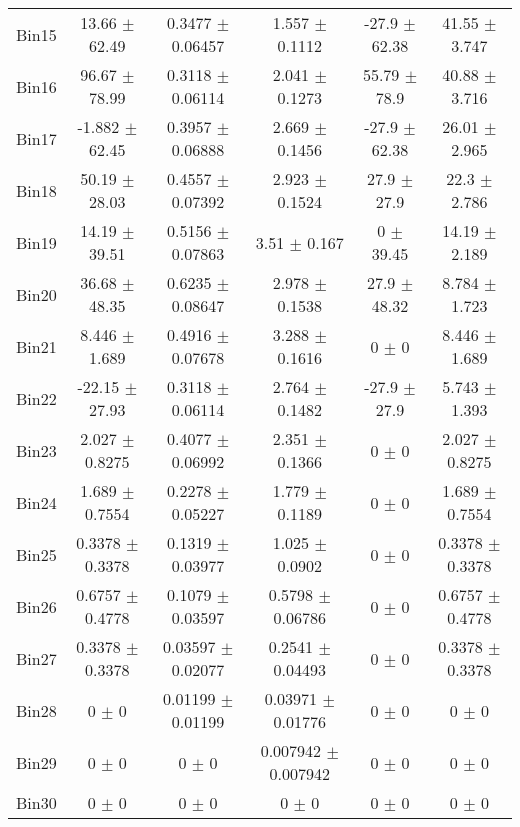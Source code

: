 \begin{tabular}{@{\extracolsep{4pt}}lccccc@{}}
     Bin15 & 13.66 $\pm$ 62.49 & 0.3477 $\pm$ 0.06457 & 1.557 $\pm$ 0.1112 & -27.9 $\pm$ 62.38 & 41.55 $\pm$ 3.747 \\ 
     Bin16 & 96.67 $\pm$ 78.99 & 0.3118 $\pm$ 0.06114 & 2.041 $\pm$ 0.1273 & 55.79 $\pm$ 78.9 & 40.88 $\pm$ 3.716 \\ 
     Bin17 & -1.882 $\pm$ 62.45 & 0.3957 $\pm$ 0.06888 & 2.669 $\pm$ 0.1456 & -27.9 $\pm$ 62.38 & 26.01 $\pm$ 2.965 \\ 
     Bin18 & 50.19 $\pm$ 28.03 & 0.4557 $\pm$ 0.07392 & 2.923 $\pm$ 0.1524 & 27.9 $\pm$ 27.9 & 22.3 $\pm$ 2.786 \\ 
     Bin19 & 14.19 $\pm$ 39.51 & 0.5156 $\pm$ 0.07863 & 3.51 $\pm$ 0.167 & 0 $\pm$ 39.45 & 14.19 $\pm$ 2.189 \\ 
     Bin20 & 36.68 $\pm$ 48.35 & 0.6235 $\pm$ 0.08647 & 2.978 $\pm$ 0.1538 & 27.9 $\pm$ 48.32 & 8.784 $\pm$ 1.723 \\ 
     Bin21 & 8.446 $\pm$ 1.689 & 0.4916 $\pm$ 0.07678 & 3.288 $\pm$ 0.1616 & 0 $\pm$ 0 & 8.446 $\pm$ 1.689 \\ 
     Bin22 & -22.15 $\pm$ 27.93 & 0.3118 $\pm$ 0.06114 & 2.764 $\pm$ 0.1482 & -27.9 $\pm$ 27.9 & 5.743 $\pm$ 1.393 \\ 
     Bin23 & 2.027 $\pm$ 0.8275 & 0.4077 $\pm$ 0.06992 & 2.351 $\pm$ 0.1366 & 0 $\pm$ 0 & 2.027 $\pm$ 0.8275 \\ 
     Bin24 & 1.689 $\pm$ 0.7554 & 0.2278 $\pm$ 0.05227 & 1.779 $\pm$ 0.1189 & 0 $\pm$ 0 & 1.689 $\pm$ 0.7554 \\ 
     Bin25 & 0.3378 $\pm$ 0.3378 & 0.1319 $\pm$ 0.03977 & 1.025 $\pm$ 0.0902 & 0 $\pm$ 0 & 0.3378 $\pm$ 0.3378 \\ 
     Bin26 & 0.6757 $\pm$ 0.4778 & 0.1079 $\pm$ 0.03597 & 0.5798 $\pm$ 0.06786 & 0 $\pm$ 0 & 0.6757 $\pm$ 0.4778 \\ 
     Bin27 & 0.3378 $\pm$ 0.3378 & 0.03597 $\pm$ 0.02077 & 0.2541 $\pm$ 0.04493 & 0 $\pm$ 0 & 0.3378 $\pm$ 0.3378 \\ 
     Bin28 & 0 $\pm$ 0 & 0.01199 $\pm$ 0.01199 & 0.03971 $\pm$ 0.01776 & 0 $\pm$ 0 & 0 $\pm$ 0 \\ 
     Bin29 & 0 $\pm$ 0 & 0 $\pm$ 0 & 0.007942 $\pm$ 0.007942 & 0 $\pm$ 0 & 0 $\pm$ 0 \\ 
     Bin30 & 0 $\pm$ 0 & 0 $\pm$ 0 & 0 $\pm$ 0 & 0 $\pm$ 0 & 0 $\pm$ 0 \\ 
\hline\hline
  \end{tabular}
